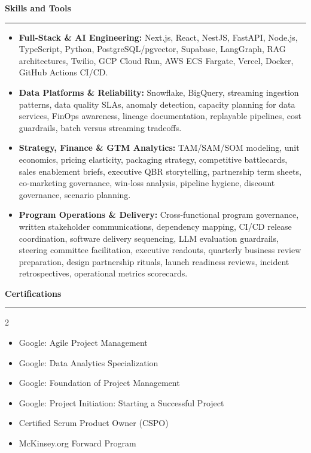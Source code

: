 \documentclass[9pt,letterpaper]{article} %
\newenvironment{rSection}[1]{ %
  \sectionskip
 \textbf{\Large #1} %
  \sectionlineskip
  \hrule %
  \begin{list}{}{ %
    \setlength{\leftmargin}{-0em} %
  }
  \item[]
}{
  \end{list}
}
\def\sectionlineskip{\smallskip} %
\def\sectionskip{} %
\begin{document}
\begin{rSection}{Skills and Tools}
\begin{itemize}[left=-1.5em, labelsep=.1cm, labelwidth=.2cm, itemsep=0.0em, topsep=0pt]
\item \textbf{Full-Stack \& AI Engineering:} Next.js, React, NestJS, FastAPI, Node.js, TypeScript, Python, PostgreSQL/pgvector, Supabase, LangGraph, RAG architectures, Twilio, GCP Cloud Run, AWS ECS Fargate, Vercel, Docker, GitHub Actions CI/CD.
\item \textbf{Data Platforms \& Reliability:} Snowflake, BigQuery, streaming ingestion patterns, data quality SLAs, anomaly detection, capacity planning for data services, FinOps awareness, lineage documentation, replayable pipelines, cost guardrails, batch versus streaming tradeoffs.
\item \textbf{Strategy, Finance \& GTM Analytics:} TAM/SAM/SOM modeling, unit economics, pricing elasticity, packaging strategy, competitive battlecards, sales enablement briefs, executive QBR storytelling, partnership term sheets, co-marketing governance, win-loss analysis, pipeline hygiene, discount governance, scenario planning.
\item \textbf{Program Operations \& Delivery:} Cross-functional program governance, written stakeholder communications, dependency mapping, CI/CD release coordination, software delivery sequencing, LLM evaluation guardrails, steering committee facilitation, executive readouts, quarterly business review preparation, design partnership rituals, launch readiness reviews, incident retrospectives, operational metrics scorecards.
\end{itemize}
\end{rSection}%
\begin{rSection}{Certifications}
\begin{multicols}{2}
\begin{itemize}[left=-1.5em, labelsep=.1cm, labelwidth=.2cm, itemsep=0.0em, topsep=0pt]
\item Google: Agile Project Management
\item Google: Data Analytics Specialization
\item Google: Foundation of Project Management
\item Google: Project Initiation: Starting a Successful Project
\item Certified Scrum Product Owner (CSPO)
\item McKinsey.org Forward Program
\end{itemize}
\end{multicols}
\end{rSection}
\end{document}
